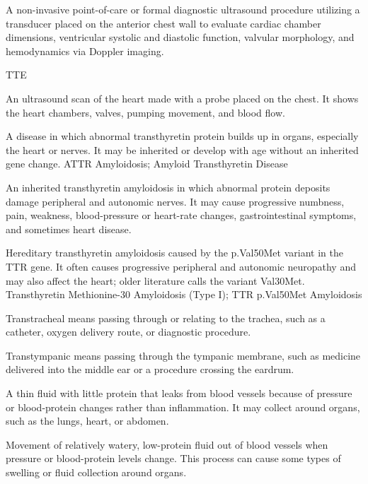  A non-invasive point-of-care or formal diagnostic ultrasound procedure utilizing a transducer placed on the anterior chest wall to evaluate cardiac chamber dimensions, ventricular systolic and diastolic function, valvular morphology, and hemodynamics via Doppler imaging.

\synonyms
TTE

 An ultrasound scan of the heart made with a probe placed on the chest. It shows the heart chambers, valves, pumping movement, and blood flow.

 A disease in which abnormal transthyretin protein builds up in organs, especially the heart or nerves. It may be inherited or develop with age without an inherited gene change.
\synonyms
ATTR Amyloidosis; Amyloid Transthyretin Disease

 An inherited transthyretin amyloidosis in which abnormal protein deposits damage peripheral and autonomic nerves. It may cause progressive numbness, pain, weakness, blood-pressure or heart-rate changes, gastrointestinal symptoms, and sometimes heart disease.

 Hereditary transthyretin amyloidosis caused by the p.Val50Met variant in the TTR gene. It often causes progressive peripheral and autonomic neuropathy and may also affect the heart; older literature calls the variant Val30Met.
\synonyms
Transthyretin Methionine-30 Amyloidosis (Type I); TTR p.Val50Met Amyloidosis

 Transtracheal means passing through or relating to the trachea, such as a catheter, oxygen delivery route, or diagnostic procedure.

 Transtympanic means passing through the tympanic membrane, such as medicine delivered into the middle ear or a procedure crossing the eardrum.

 A thin fluid with little protein that leaks from blood vessels because of pressure or blood-protein changes rather than inflammation. It may collect around organs, such as the lungs, heart, or abdomen.

 Movement of relatively watery, low-protein fluid out of blood vessels when pressure or blood-protein levels change. This process can cause some types of swelling or fluid collection around organs.

